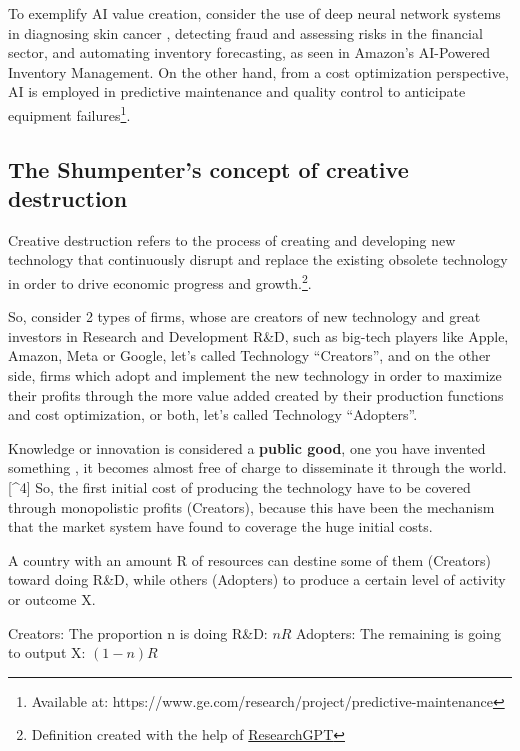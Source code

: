 \documentclass[preprint, 3p,
authoryear]{elsarticle} %
\begin{document}
To exemplify AI value creation, consider the use of deep neural network
systems in diagnosing skin cancer \citep{cancer}, detecting fraud and
assessing risks in the financial sector, and automating inventory
forecasting, as seen in Amazon's AI-Powered Inventory Management. On the
other hand, from a cost optimization perspective, AI is employed in
predictive maintenance and quality control to anticipate equipment
failures\footnote{Available at:
  https://www.ge.com/research/project/predictive-maintenance}.

\hypertarget{the-shumpenters-concept-of-creative-destruction}{%
\subsection{The Shumpenter's concept of creative
destruction}\label{the-shumpenters-concept-of-creative-destruction}}

Creative destruction refers to the process of creating and developing
new technology that continuously disrupt and replace the existing
obsolete technology in order to drive economic progress and
growth.\footnote{Definition created with the help of
  \href{https://github.com/mukulpatnaik/researchgpt.git}{ResearchGPT}}.

So, consider 2 types of firms, whose are creators of new technology and
great investors in Research and Development R\&D, such as big-tech
players like Apple, Amazon, Meta or Google, let's called Technology
``Creators'', and on the other side, firms which adopt and implement the
new technology in order to maximize their profits through the more value
added created by their production functions and cost optimization, or
both, let's called Technology ``Adopters''.

Knowledge or innovation is considered a \textbf{public good}, one you
have invented something , it becomes almost free of charge to
disseminate it through the world.{[}\^{}4{]} So, the first initial cost
of producing the technology have to be covered through monopolistic
profits (Creators), because this have been the mechanism that the market
system have found to coverage the huge initial costs.

A country with an amount R of resources can destine some of them
(Creators) toward doing R\&D, while others (Adopters) to produce a
certain level of activity or outcome X.

Creators: The proportion n is doing R\&D: \(nR\) Adopters: The remaining
is going to output X: \((1-n)R\)
\end{document}

